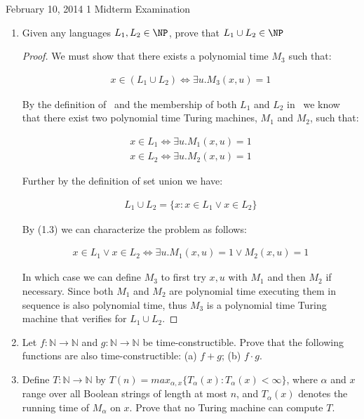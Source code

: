 \documentclass[usletter]{article}
\begin{document}
           {February 10, 2014}
           {1}
           {Midterm Examination}

\begin{enumerate}
  \item Given any languages $L_1, L_2 \in \NP$, prove that $L_1 \cup L_2 \in \NP$
    \begin{proof}
      We must show that there exists a polynomial time $M_3$ such that:

      \begin{align}
        x \in (L_1 \cup L_2) \iff \exists u.M_3(x,u) = 1
      \end{align}

      By the definition of \NP\ and the membership of both $L_1$ and $L_2$ in \NP\  we know that there exist two polynomial time Turing machines, $M_1$ and $M_2$, such that:

      \begin{align}
        x \in L_1 \iff \exists u.M_1(x,u) = 1 \\
        x \in L_2 \iff \exists u.M_2(x,u) = 1
      \end{align}

      Further by the definition of set union we have:

      \begin{align}
        L_1 \cup L_2 = \{ x : x \in L_1 \lor x \in L_2 \}
      \end{align}

      By (1.3) we can characterize the problem as follows:

      \begin{align}
        x \in L_1 \lor x \in L_2 \iff \exists u.M_1(x,u) = 1 \lor  M_2(x,u) = 1
      \end{align}

      In which case we can define $M_3$ to first try $x,u$ with $M_1$ and then $M_2$ if necessary. Since both $M_1$ and $M_2$ are polynomial time executing them in sequence is also polynomial time, thus $M_3$ is a polynomial time Turing machine that verifies for $L_1 \cup L_2$.


    \end{proof}

    \newpage

  \item Let $f : \mathbb{N} \rightarrow \mathbb{N}$ and $g : \mathbb{N} \rightarrow \mathbb{N}$ be time-constructible. Prove that the following functions are also time-constructible: (a) $f + g$; (b) $f \cdot g$.
  \item Define $T : \mathbb{N} \rightarrow \mathbb{N}$ by $T(n) = max_{\alpha,x}\{T_{\alpha}(x) : T_{\alpha}(x) < \infty \}$, where $\alpha$ and $x$ range over all Boolean strings of length at most $n$, and $T_{\alpha}(x)$ denotes the running time of $M_{\alpha}$ on $x$. Prove that no Turing machine can compute $T$.


\end{enumerate}
\end{document}
